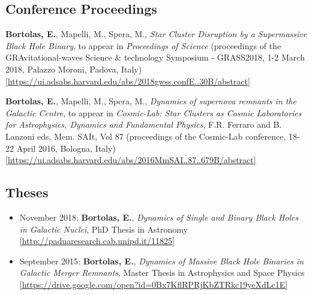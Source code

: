 \subsection*{Conference Proceedings }



\begin{etaremune}

\item {\bf Bortolas, E.}, Mapelli, M., Spera, M., {\it Star Cluster Disruption by a Supermassive Black Hole Binary}, to appear in {\it Proceedings of Science}  (proceedings of the  GRAvitational-waves Science \& technology Symposium - GRASS2018, 1-2 March 2018, Palazzo Moroni, Padova, Italy) \\ \href{https://ui.adsabs.harvard.edu/abs/2018gwss.confE..30B/abstract}{\scriptsize [https://ui.adsabs.harvard.edu/abs/2018gwss.confE..30B/abstract]}




\item {\bf Bortolas, E.}, Mapelli, M., Spera, M., {\it Dynamics of supernova remnants in the Galactic Centre}, to appear in {\it Cosmic-Lab: Star Clusters as Cosmic Laboratories for Astrophysics, Dynamics and Fundamental Physics}, F.R. Ferraro and B. Lanzoni eds, Mem. SAIt, Vol 87 (proceedings of the Cosmic-Lab conference, 18-22 April 2016, Bologna, Italy)\\ \href{https://ui.adsabs.harvard.edu/abs/2016MmSAI..87..679B/abstract}{\scriptsize [https://ui.adsabs.harvard.edu/abs/2016MmSAI..87..679B/abstract]}



\end{etaremune}

\subsection*{Theses}


\begin{itemize}
   \item {\normalfont November 2018:} {\bf Bortolas, E.}, {\it Dynamics of Single and Binary Black Holes in Galactic Nuclei}, PhD Thesis in Astronomy \href{http://paduaresearch.cab.unipd.it/11825}{\scriptsize [http://paduaresearch.cab.unipd.it/11825]}
  \item {\normalfont September 2015:} {\bf Bortolas, E.}, {\it Dynamics of Massive Black Hole Binaries in Galactic Merger Remnants}, Master Thesis in Astrophysics and Space Physics \href{https://drive.google.com/open?id=0Bx7KflRPRjKbZTRkc19yeXdLc1E}{\scriptsize [https://drive.google.com/open?id=0Bx7KflRPRjKbZTRkc19yeXdLc1E]}
\end{itemize}
